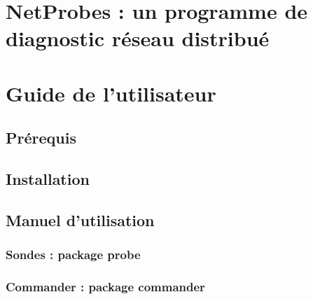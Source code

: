 \documentclass[a4paper,11pt]{article}
\begin{document}


\tableofcontents

\section{NetProbes : un programme de diagnostic réseau distribué}


\section{Guide de l'utilisateur}
\subsection{Prérequis}

\subsection{Installation}

\subsection{Manuel d'utilisation}
\subsubsection{Sondes : package probe}
\subsubsection{Commander : package commander}




\end{document}
